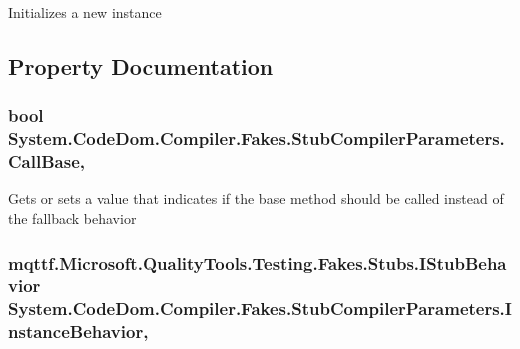 Initializes a new instance



\subsection{Property Documentation}
\hypertarget{class_system_1_1_code_dom_1_1_compiler_1_1_fakes_1_1_stub_compiler_parameters_a222fa8d7620e64fb6986c6820ab6d473}{
\subsubsection[{Call\-Base}]{\setlength{\rightskip}{0pt plus 5cm}bool System.\-Code\-Dom.\-Compiler.\-Fakes.\-Stub\-Compiler\-Parameters.\-Call\-Base\hspace{0.3cm}{\ttfamily [get]}, {\ttfamily [set]}}}\label{class_system_1_1_code_dom_1_1_compiler_1_1_fakes_1_1_stub_compiler_parameters_a222fa8d7620e64fb6986c6820ab6d473}


Gets or sets a value that indicates if the base method should be called instead of the fallback behavior

\hypertarget{class_system_1_1_code_dom_1_1_compiler_1_1_fakes_1_1_stub_compiler_parameters_a73f657778349aae0375585cc3cba4d57}{
\subsubsection[{Instance\-Behavior}]{\setlength{\rightskip}{0pt plus 5cm}mqttf.\-Microsoft.\-Quality\-Tools.\-Testing.\-Fakes.\-Stubs.\-I\-Stub\-Behavior System.\-Code\-Dom.\-Compiler.\-Fakes.\-Stub\-Compiler\-Parameters.\-Instance\-Behavior\hspace{0.3cm}{\ttfamily [get]}, {\ttfamily [set]}}}\label{class_system_1_1_code_dom_1_1_compiler_1_1_fakes_1_1_stub_compiler_parameters_a73f657778349aae0375585cc3cba4d57}


